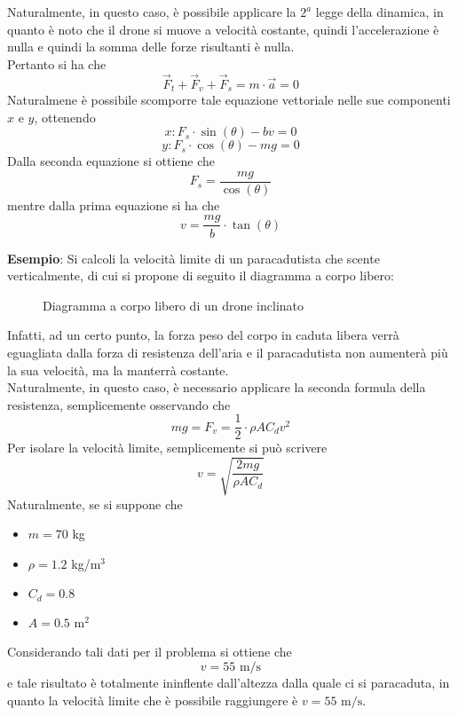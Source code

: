\documentclass[a4paper]{extarticle}
\begin{document}
\vspace{1em}
\noindent
Naturalmente, in questo caso, è possibile applicare la $2^a$ legge della dinamica, in quanto è noto che il drone si muove a velocità costante, quindi l'accelerazione è nulla e quindi la somma delle forze risultanti è nulla.\\
Pertanto si ha che
\[\vec{F}_t + \vec{F}_v + \vec{F}_s = m \cdot \vec{a} = 0\]
Naturalmene è possibile scomporre tale equazione vettoriale nelle sue componenti $x$ e $y$, ottenendo
\[x: F_s \cdot \sin(\theta) - b v = 0\]
\[y: F_s \cdot \cos(\theta) - m g = 0\]
Dalla seconda equazione si ottiene che
\[F_s = \frac{m g}{\cos(\theta)}\]
mentre dalla prima equazione si ha che
\[v = \frac{mg}{b} \cdot \tan(\theta)\]

\vspace{1em}
\noindent
\textbf{Esempio}: Si calcoli la velocità limite di un paracadutista che scente verticalmente, di cui si propone di seguito il diagramma a corpo libero:

\vspace{1em}
\begin{figure}[H]
  \centering
  \caption{Diagramma a corpo libero di un drone inclinato}
  \label{fig:diagramma_corpo_libero_drone_inclinato}
\end{figure}

\vspace{1em}
\noindent
Infatti, ad un certo punto, la forza peso del corpo in caduta libera verrà eguagliata dalla forza di resistenza dell'aria e il paracadutista non aumenterà più la sua velocità, ma la manterrà costante.\\
Naturalmente, in questo caso, è necessario applicare la seconda formula della resistenza, semplicemente osservando che
\[mg = F_v = \frac{1}{2} \cdot \rho A C_d v^2\]
Per isolare la velocità limite, semplicemente si può scrivere
\[v = \sqrt{\frac{2 m g}{\rho A C_d}}\]
Naturalmente, se si suppone che
\begin{itemize}
  \item $m = 70$ kg
  \item $\rho = 1.2$ kg/m$^3$
  \item $C_d = 0.8$
  \item $A = 0.5$ m$^2$
\end{itemize}
Considerando tali dati per il problema si ottiene che
\[v = 55 \text{ m/s}\]
e tale risultato è totalmente ininflente dall'altezza dalla quale ci si paracaduta, in quanto la velocità limite che è possibile raggiungere è $v = 55 \text{ m/s}$.
\end{document}
